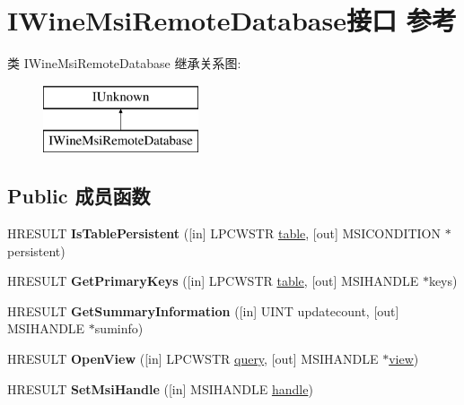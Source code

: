 \hypertarget{interface_i_wine_msi_remote_database}{}\section{I\+Wine\+Msi\+Remote\+Database接口 参考}
\label{interface_i_wine_msi_remote_database}
类 I\+Wine\+Msi\+Remote\+Database 继承关系图\+:\begin{figure}[H]
\begin{center}
\leavevmode
\includegraphics[height=2.000000cm]{interface_i_wine_msi_remote_database}
\end{center}
\end{figure}
\subsection*{Public 成员函数}
\begin{DoxyCompactItemize}
\item 
\mbox{\label{interface_i_wine_msi_remote_database_aa3456f68b1aa5a995a792a70fcfdf0d9}} 
H\+R\+E\+S\+U\+LT {\bfseries Is\+Table\+Persistent} (\mbox{[}in\mbox{]} L\+P\+C\+W\+S\+TR \hyperlink{structtable}{table}, \mbox{[}out\mbox{]} M\+S\+I\+C\+O\+N\+D\+I\+T\+I\+ON $\ast$persistent)
\item 
\mbox{\label{interface_i_wine_msi_remote_database_aa9899ae2abc391703f14eddfe68859e7}} 
H\+R\+E\+S\+U\+LT {\bfseries Get\+Primary\+Keys} (\mbox{[}in\mbox{]} L\+P\+C\+W\+S\+TR \hyperlink{structtable}{table}, \mbox{[}out\mbox{]} M\+S\+I\+H\+A\+N\+D\+LE $\ast$keys)
\item 
\mbox{\label{interface_i_wine_msi_remote_database_a70a6983680e67a60f9ab46bb0a2f9d25}} 
H\+R\+E\+S\+U\+LT {\bfseries Get\+Summary\+Information} (\mbox{[}in\mbox{]} U\+I\+NT updatecount, \mbox{[}out\mbox{]} M\+S\+I\+H\+A\+N\+D\+LE $\ast$suminfo)
\item 
\mbox{\label{interface_i_wine_msi_remote_database_abfc6144302c5c80aa16f8c75961ab89b}} 
H\+R\+E\+S\+U\+LT {\bfseries Open\+View} (\mbox{[}in\mbox{]} L\+P\+C\+W\+S\+TR \hyperlink{structquery}{query}, \mbox{[}out\mbox{]} M\+S\+I\+H\+A\+N\+D\+LE $\ast$\hyperlink{structview}{view})
\item 
\mbox{\label{interface_i_wine_msi_remote_database_a54a8866ab154684e5cf2578d17ddcf7f}} 
H\+R\+E\+S\+U\+LT {\bfseries Set\+Msi\+Handle} (\mbox{[}in\mbox{]} M\+S\+I\+H\+A\+N\+D\+LE \hyperlink{structhandle}{handle})
\end{DoxyCompactItemize}
